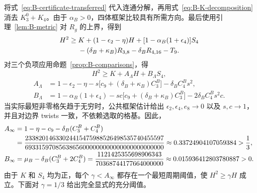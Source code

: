{将式~\eqref{eq:B-certificate-transferred} 代入连通分解，再用式~\eqref{eq:B-K-decomposition} 消去 $K_3^0+K_4$。由于 $\alpha_B>0$，四体框架比较具有所需方向。最后使用引理~\ref{lem:B-metric} 对 $R_g$ 的上界，得到}
\begin{align}
 H^2\ge{}&K+(1-\epsilon_2-\eta)H
       +[1-\alpha_B(1+\epsilon_4)]S_4
 \notag\\
 &-(\delta_B+\kappa_B)R_{3,8}
       -\delta_B R_{4,16}-T_9.
 \label{eq:B-master-before-payment}
\end{align}
{对三个负项应用命题~\ref{prop:B-comparisons}，得}
\begin{equation}
 H^2\ge K+A_\Lambda H+B_\Lambda S_4,
 \label{eq:B-master}
\end{equation}
\begin{align}
 A_\Lambda
 &=1-\epsilon_2-\eta
       -s\bigl[c_9+(\delta_B+\kappa_B)C_3^B\bigr]
       -\delta_B C_4^B s^2,
 \label{eq:B-A-budget}\\
 B_\Lambda
 &=1-\alpha_B(1+\epsilon_4)
       -sc\bigl[c_9+(\delta_B+\kappa_B)C_3^B\bigr]
       -2\delta_B C_4^B s^2c.
 \label{eq:B-B-budget}
\end{align}
{当实际最短非零格矢趋于无穷时，公共框架估计给出 $\epsilon_2,\epsilon_4,e_8\to0$ 以及 $s,c\to1$，并且对边界 twists 一致，不依赖选取的格基。因此，}
\begin{align}
 A_\infty
 &=1-\eta-c_9-\delta_B(C_3^B+C_4^B)
 \notag\\
 &=\frac{23382014633024415475988526498535740455597}
         {69331597085638656000000000000000000000000}
   \approx0.33724904107059384>\frac13,
 \label{eq:B-A-infinity}\\
 B_\infty
 &=\mu_B-\delta_B(C_3^B+2C_4^B)
   =\frac{1121425355698906343}{70368744177664000000}
   \approx0.015936412803780887>0.
 \label{eq:B-B-infinity}
\end{align}
{由于 $K$ 和 $S_4$ 均为正，每个 $\gamma<A_\infty$ 都存在一个最短周期阈值，使 $H^2\ge\gamma H$ 成立。下面对 $\gamma=1/3$ 给出完全显式的充分阈值。}

